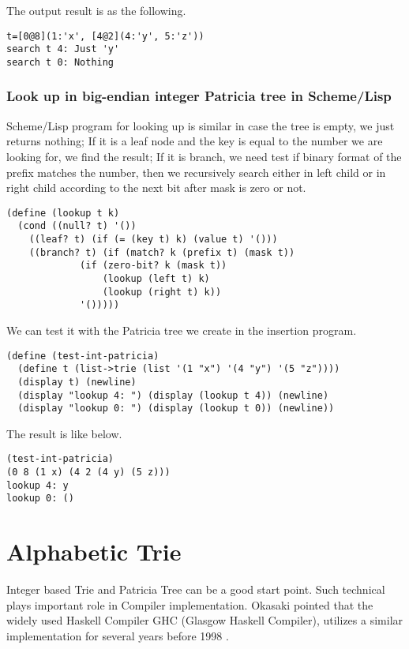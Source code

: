 \documentclass{article}
\begin{document}
The output result is as the following.

\begin{verbatim}
t=[0@8](1:'x', [4@2](4:'y', 5:'z'))
search t 4: Just 'y'
search t 0: Nothing
\end{verbatim}

\subsubsection*{Look up in big-endian integer Patricia tree in
Scheme/Lisp}

Scheme/Lisp program for looking up is similar in case the tree is
empty, we just returns nothing; If it is a leaf node and the key is
equal to the number we are looking for, we find the result; If it is
branch, we need test if binary format of the prefix matches the
number, then we recursively search either in left child or in right
child according to the next bit after mask is zero or not.

\lstset{language=lisp}
\begin{lstlisting}
(define (lookup t k)
  (cond ((null? t) '())
	((leaf? t) (if (= (key t) k) (value t) '()))
	((branch? t) (if (match? k (prefix t) (mask t))
			 (if (zero-bit? k (mask t))
			     (lookup (left t) k)
			     (lookup (right t) k))
			 '()))))
\end{lstlisting}

We can test it with the Patricia tree we create in the insertion
program.

\begin{lstlisting}
(define (test-int-patricia)
  (define t (list->trie (list '(1 "x") '(4 "y") '(5 "z"))))
  (display t) (newline)
  (display "lookup 4: ") (display (lookup t 4)) (newline)
  (display "lookup 0: ") (display (lookup t 0)) (newline))
\end{lstlisting}

The result is like below.

\begin{lstlisting}
(test-int-patricia)
(0 8 (1 x) (4 2 (4 y) (5 z)))
lookup 4: y
lookup 0: ()
\end{lstlisting}

\section{Alphabetic Trie}
Integer based Trie and Patricia Tree can be a good start point. Such
technical plays important role in Compiler implementation. Okasaki
pointed that the widely used Haskell Compiler GHC (Glasgow Haskell 
Compiler), utilizes a similar implementation for several years before
1998 \cite{okasaki-int-map}. 
\end{document}
